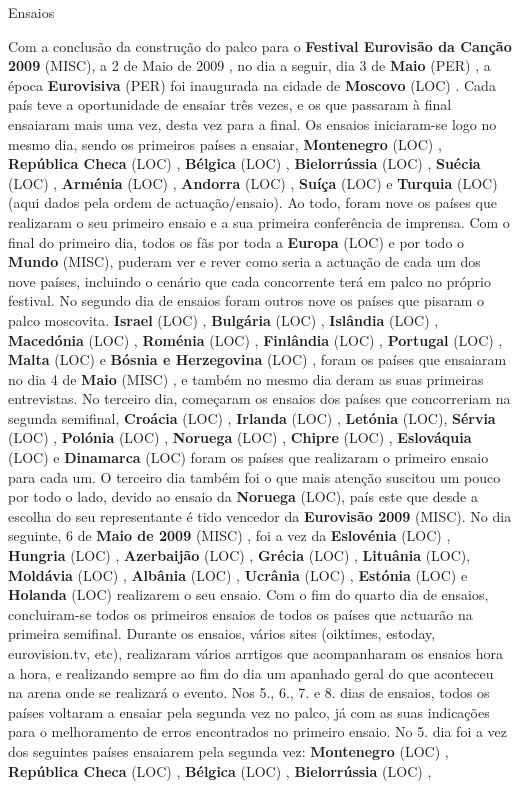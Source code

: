 \documentclass[12pt,a4paper]{article}
\begin{document}
Ensaios

Com a conclusão da construção do palco para o \textbf{Festival Eurovisão da Canção 2009} (MISC), a 2 de Maio de 2009 , no dia a seguir, dia 3 de \textbf{Maio} (PER) , a época \textbf{Eurovisiva} (PER) foi inaugurada na cidade de \textbf{Moscovo} (LOC) . Cada país teve a oportunidade de ensaiar três vezes, e os que passaram à final ensaiaram mais uma vez, desta vez para a final. Os ensaios iniciaram-se logo no mesmo dia, sendo os primeiros países a ensaiar, \textbf{Montenegro} (LOC) , \textbf{República Checa} (LOC) , \textbf{Bélgica} (LOC) , \textbf{Bielorrússia} (LOC) , \textbf{Suécia} (LOC) , \textbf{Arménia} (LOC) , \textbf{Andorra} (LOC) , \textbf{Suíça} (LOC) e \textbf{Turquia} (LOC) (aqui dados pela ordem de actuação/ensaio). Ao todo, foram nove os países que realizaram o seu primeiro ensaio e a sua primeira conferência de imprensa. Com o final do primeiro dia, todos os fãs por toda a \textbf{Europa} (LOC) e por todo o \textbf{Mundo} (MISC), puderam ver e rever como seria a actuação de cada um dos nove países, incluindo o cenário que cada concorrente terá em palco no próprio festival. No segundo dia de ensaios foram outros nove os países que pisaram o palco moscovita. \textbf{Israel} (LOC) , \textbf{Bulgária} (LOC) , \textbf{Islândia} (LOC) , \textbf{Macedónia} (LOC) , \textbf{Roménia} (LOC) , \textbf{Finlândia} (LOC) , \textbf{Portugal} (LOC) , \textbf{Malta} (LOC) e \textbf{Bósnia e Herzegovina} (LOC) , foram os países que ensaiaram no dia 4 de \textbf{Maio} (MISC) , e também no mesmo dia deram as suas primeiras entrevistas. No terceiro dia, começaram os ensaios dos países que concorreriam na segunda semifinal, \textbf{Croácia} (LOC) , \textbf{Irlanda} (LOC) , \textbf{Letónia} (LOC), \textbf{Sérvia} (LOC) , \textbf{Polónia} (LOC) , \textbf{Noruega} (LOC) , \textbf{Chipre} (LOC) , \textbf{Eslováquia} (LOC) e \textbf{Dinamarca} (LOC) foram os países que realizaram o primeiro ensaio para cada um. O terceiro dia também foi o que mais atenção suscitou um pouco por todo o lado, devido ao ensaio da \textbf{Noruega} (LOC), país este que desde a escolha do seu representante é tido vencedor da \textbf{Eurovisão 2009} (MISC). No dia seguinte, 6 de \textbf{Maio de 2009} (MISC) , foi a vez da \textbf{Eslovénia} (LOC) , \textbf{Hungria} (LOC) , \textbf{Azerbaijão} (LOC) , \textbf{Grécia} (LOC) , \textbf{Lituânia} (LOC), \textbf{Moldávia} (LOC) , \textbf{Albânia} (LOC) , \textbf{Ucrânia} (LOC) , \textbf{Estónia} (LOC) e \textbf{Holanda} (LOC) realizarem o seu ensaio. Com o fim do quarto dia de ensaios, concluiram-se todos os primeiros ensaios de todos os países que actuarão na primeira semifinal. Durante os ensaios, vários sites (oiktimes, estoday, eurovision.tv, etc), realizaram vários arrtigos que acompanharam os ensaios hora a hora, e realizando sempre ao fim do dia um apanhado geral do que aconteceu na arena onde se realizará o evento. Nos 5., 6., 7. e 8. dias de ensaios, todos os países voltaram a ensaiar pela segunda vez no palco, já com as suas indicações para o melhoramento de erros encontrados no primeiro ensaio. No 5. dia foi a vez dos seguintes países ensaiarem pela segunda vez: \textbf{Montenegro} (LOC) , \textbf{República Checa} (LOC) , \textbf{Bélgica} (LOC) , \textbf{Bielorrússia} (LOC) , 
\end{document}
